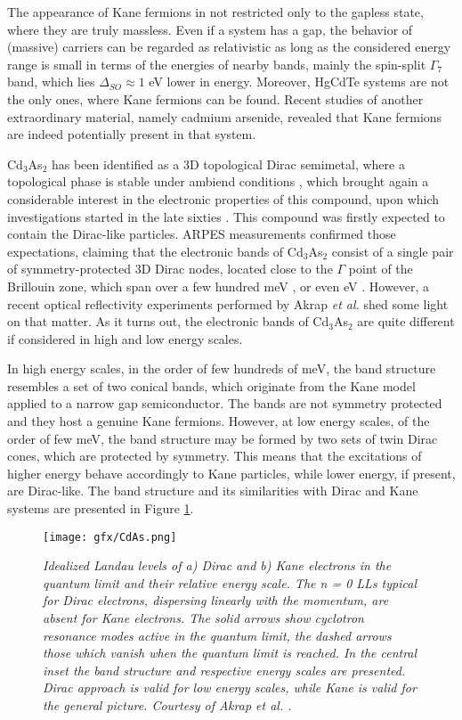 \documentclass[titlepage,a4paper]{book}
\begin{document}
The appearance of Kane fermions in not restricted only to the gapless state, where they are truly massless. Even if a system has a gap, the behavior of (massive) carriers can be regarded as relativistic as long as the considered energy range is small in terms of the energies of nearby bands, mainly the spin-split $\Gamma_7$ band, which lies $\Delta_{SO} \approx 1$ eV \cite{Novik_MCT} lower in energy. Moreover, HgCdTe systems are not the only ones, where Kane fermions can be found. Recent studies of another extraordinary material, namely cadmium arsenide, revealed that Kane fermions are indeed potentially present in that system.

Cd$_3$As$_2$ has been identified as a 3D topological Dirac semimetal, where a topological phase is stable under ambiend conditions \cite{Liu_CdAs}, which brought again a considerable interest in the electronic properties of this compound, upon which investigations started in the late sixties \cite{Roseman_CdAs}\cite{Bodnar_CdAs}. This compound was firstly expected to contain the Dirac-like particles. ARPES measurements confirmed those expectations, claiming that the electronic bands of Cd$_3$As$_2$ consist of a single pair of symmetry-protected 3D Dirac nodes, located close to the $\Gamma$ point of the Brillouin zone, which span over a few hundred meV \cite{Borisenko_CdAs}\cite{Neupane_CdAs}, or even eV \cite{Liu_CdAs}. However, a recent optical reflectivity experiments performed by Akrap \textit{et al.} \cite{Akrap_CdAs} shed some light on that matter. As it turns out, the electronic bands of Cd$_3$As$_2$ are quite different if considered in high and low energy scales. 

In high energy scales, in the order of few hundreds of meV, the band structure resembles a set of two conical bands, which originate from the Kane model applied to a narrow gap semiconductor. The bands are not symmetry protected and they host a genuine Kane fermions. However, at low energy scales, of the order of few meV, the band structure may be formed by two sets of twin Dirac cones, which are protected by symmetry. This means that the excitations of higher energy behave accordingly to Kane particles, while lower energy, if present, are Dirac-like. The band structure and its similarities with Dirac and Kane systems are presented in Figure \ref{fig:CdAs_bandStructure}. 

\begin{figure}[ht]
	\centering
	\texttt{[image: gfx/CdAs.png]}
	\vspace{-10pt}
	\caption{\textit{Idealized Landau levels of a) Dirac and b) Kane electrons in the quantum limit and their relative energy scale. The n = 0 LLs typical for Dirac electrons, dispersing linearly with the momentum, are absent for Kane electrons. The solid arrows show cyclotron resonance modes active in the quantum limit, the dashed arrows those which vanish when the quantum limit is reached. In the central inset the band structure and respective energy scales are presented. Dirac approach is valid for low energy scales, while Kane is valid for the general picture. Courtesy of Akrap et al. \cite{Akrap_CdAs}.}}
	\label{fig:CdAs_bandStructure}
\end{figure} 
\end{document}
